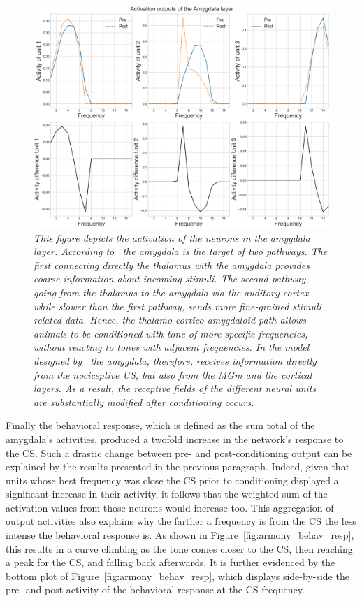 \begin{figure}[!htbp]
   \begin{center}
      \includegraphics[width=\textwidth]{Figs/activation_amygdala}
      \caption{\textit{This figure depicts the activation of the neurons in the amygdala layer. According to~\citet{Ledoux1992} the amygdala is the target of two pathways. The first connecting directly the thalamus with the amygdala provides coarse information about incoming stimuli. The second pathway, going from the thalamus to the amygdala via the auditory cortex while slower than the first pathway, sends more fine-grained stimuli related data. Hence, the thalamo-cortico-amygdaloid path allows animals to be conditioned with tone of more specific frequencies, without reacting to tones with adjacent frequencies. In the model designed by~\citet{Armony1995} the amygdala, therefore, receives information directly from the nociceptive US, but also from the MGm and the cortical layers. As a result, the receptive fields of the different neural units are substantially modified after conditioning occurs.}}\label{fig:armony_act_amyg}
   \end{center}
\end{figure}

Finally the behavioral response, which is defined as the sum total of the amygdala's activities, produced a twofold increase in the network's response to the CS\@. Such a drastic change between pre- and post-conditioning output can be explained by the results presented in the previous paragraph. Indeed, given that units whose best frequency was close the CS prior to conditioning displayed a significant increase in their activity, it follows that the weighted sum of the activation values from those neurons would increase too. This aggregation of output activities also explains why the farther a frequency is from the CS the less intense the behavioral response is. As shown in Figure~\ref{fig:armony_behav_resp}, this results in a curve climbing as the tone comes closer to the CS, then reaching a peak for the CS, and falling back afterwards. It is further evidenced by the bottom plot of Figure~\ref{fig:armony_behav_resp}, which displays side-by-side the pre- and post-activity of the behavioral response at the CS frequency.

